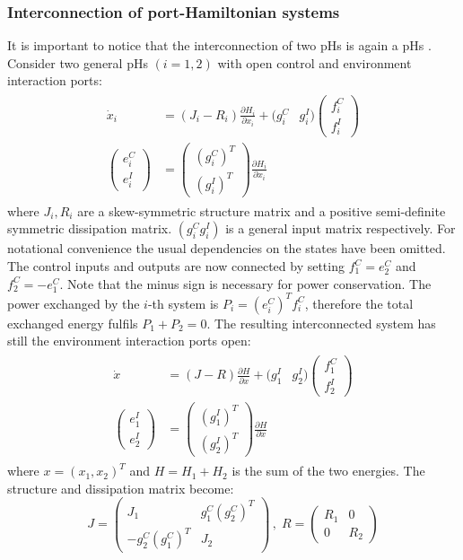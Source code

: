 \documentclass[a4paper,twoside, openright,12pt]{report}
\begin{document}
\subsubsection{Interconnection of port-Hamiltonian systems}
It is important to notice that the interconnection of two pHs is again a pHs \cite{Schaft_14}. Consider two general pHs $(i=1,2)$ with open control and environment interaction ports:
\begin{eqnarray}
\begin{aligned}
	\dot{x}_i &= (J_i - R_i)\frac{\partial H_i}{\partial x_i}+ (g_i^C & g_i^I)\begin{pmatrix}f_i^C \\ f_i^I\end{pmatrix}\\
	\begin{pmatrix}e_i^C \\ e_i^I\end{pmatrix} &= \begin{pmatrix}(g_i^C)^T \\ (g_i^I)^T\end{pmatrix}\frac{\partial H_i}{\partial x_i}
\end{aligned}
\end{eqnarray}
where $J_i,R_i$ are a skew-symmetric structure matrix and a positive semi-definite symmetric dissipation matrix. $(g_i^C g_i^I)$ is a general input matrix respectively.
For notational convenience the usual dependencies on the states have been omitted. The control inputs and outputs are now connected by setting $f_1^C = e_2^C $ and $ f_2^C = -e_1^C $. Note that the minus sign is necessary for power conservation. The power exchanged by the $i$-th system is $P_i = (e_i^C)^Tf_i^C$, therefore the total exchanged energy fulfils $ P_1 + P_2 = 0 $. The resulting interconnected system has still the environment interaction ports open:
\begin{eqnarray}
\begin{aligned}
	\dot{x} &= (J - R)\frac{\partial H}{\partial x}+ (g_1^I & g_2^I)\begin{pmatrix}f_1^C \\ f_2^I\end{pmatrix}\\
	\begin{pmatrix}e_1^I \\ e_2^I\end{pmatrix} &= \begin{pmatrix}(g_1^I)^T \\ (g_2^I)^T\end{pmatrix}\frac{\partial H}{\partial x}
\end{aligned}
\end{eqnarray}
where $ x = (x_1, x_2)^T $ and $ H = H_1 + H_2 $ is the sum of the two energies. The structure and dissipation matrix become:
\[J = \begin{pmatrix} J_1 & g_1^C(g_2^C)^T \\ 
-g_2^C(g_1^C)^T & J_2\end{pmatrix} \, , \; 
R = \begin{pmatrix}
R_1 & 0 \\ 0 & R_2\end{pmatrix}\]
\end{document}
